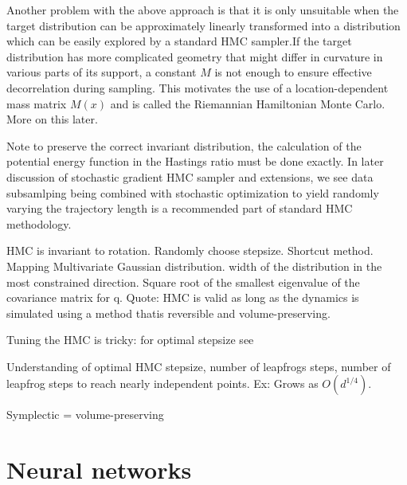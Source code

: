 \documentclass[]{report}
\begin{document}
Another problem with the above approach is that it is only unsuitable when the
target distribution can be approximately linearly transformed into a
distribution which can be easily explored by a standard HMC sampler.If the target
distribution has more complicated geometry that might differ in
curvature in various parts of its support, a constant $M$ is not enough to ensure
effective decorrelation during sampling. This motivates the use of
a location-dependent mass matrix $M(x)$ and is called the Riemannian Hamiltonian
Monte Carlo. More on this later. 






Note to preserve the correct invariant distribution, the calculation of the
potential energy function in the Hastings ratio must be done exactly. In later
discussion of stochastic gradient HMC sampler and extensions, we see data
subsamlping being combined with stochastic optimization to yield 
randomly varying the trajectory length is a recommended part of standard HMC
methodology. 

HMC is invariant to rotation.
Randomly choose stepsize. 
Shortcut method.
Mapping Multivariate Gaussian distribution. width of the distribution in the most constrained direction. Square root of the smallest eigenvalue of the covariance matrix for q.
Quote: HMC is valid as long as the dynamics is simulated using a method thatis reversible and volume-preserving. 

Tuning the HMC is tricky: for optimal stepsize see \cite{beskos2013optimal}

Understanding of optimal HMC stepsize, number of leapfrogs steps, number of leapfrog steps to reach nearly independent points.
Ex: Grows as $O(d^{1/4})$.







Symplectic  = volume-preserving


\section{Neural networks} 
\end{document}
